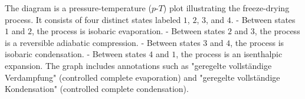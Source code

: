 The diagram is a pressure-temperature (\( p \)-\( T \)) plot illustrating the freeze-drying process. It consists of four distinct states labeled \( 1 \), \( 2 \), \( 3 \), and \( 4 \).  
- Between states \( 1 \) and \( 2 \), the process is isobaric evaporation.  
- Between states \( 2 \) and \( 3 \), the process is a reversible adiabatic compression.  
- Between states \( 3 \) and \( 4 \), the process is isobaric condensation.  
- Between states \( 4 \) and \( 1 \), the process is an isenthalpic expansion.  
The graph includes annotations such as "geregelte vollständige Verdampfung" (controlled complete evaporation) and "geregelte vollständige Kondensation" (controlled complete condensation).